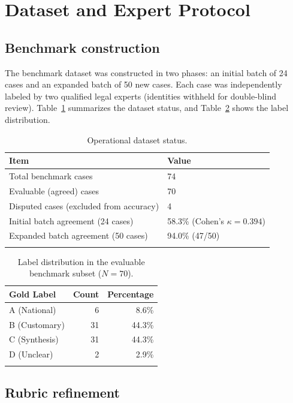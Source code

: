 \documentclass[pdflatex,sn-basic,Numbered]{sn-jnl}
\begin{document}
\section{Dataset and Expert Protocol}\label{sec:dataset}

\subsection{Benchmark construction}\label{subsec:benchmark}

The benchmark dataset was constructed in two phases: an initial batch of 24 cases and an expanded batch of 50 new cases.
Each case was independently labeled by two qualified legal experts (identities withheld for double-blind review).
Table~\ref{tab:status} summarizes the dataset status, and Table~\ref{tab:labeldist} shows the label distribution.

\begin{table}[t]
\caption{Operational dataset status.}\label{tab:status}
\begin{tabular*}{\textwidth}{@{\extracolsep\fill}ll}
\toprule
Item & Value \\
\midrule
Total benchmark cases & 74 \\
Evaluable (agreed) cases & 70 \\
Disputed cases (excluded from accuracy) & 4 \\
Initial batch agreement (24 cases) & 58.3\% (Cohen's $\kappa = 0.394$) \\
Expanded batch agreement (50 cases) & 94.0\% (47/50) \\
\botrule
\end{tabular*}
\end{table}

\begin{table}[t]
\caption{Label distribution in the evaluable benchmark subset ($N=70$).}\label{tab:labeldist}
\begin{tabular*}{\textwidth}{@{\extracolsep\fill}lrr}
\toprule
Gold Label & Count & Percentage \\
\midrule
A (National) & 6 & 8.6\% \\
B (Customary) & 31 & 44.3\% \\
C (Synthesis) & 31 & 44.3\% \\
D (Unclear) & 2 & 2.9\% \\
\botrule
\end{tabular*}
\end{table}

\subsection{Rubric refinement}\label{subsec:rubric}
\end{document}
